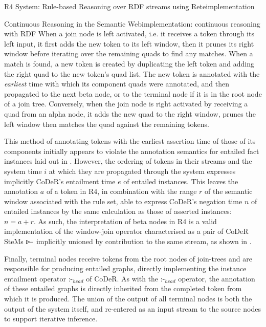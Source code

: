 \begin{nestedsection}{R4 System: Rule-based Reasoning over RDF streams using Rete}{implementation}
\begin{nestedsection}{Continuous Reasoning in the Semantic Web}{implementation: continuous reasoning with RDF}
		When a join node is left activated, i.e. it receives a token through its left input, it first adds the new token to its left window, then it prunes its right window before iterating over the remaining quads to find any matches.
		When a match is found, a new token is created by duplicating the left token and adding the right quad to the new token's quad list.
		The new token is annotated with the \emph{earliest} time with which its component quads were annotated, and then propagated to the next beta node, or to the terminal node if it is in the root node of a join tree.
		Conversely, when the join node is right activated by receiving a quad from an alpha node, it adds the new quad to the right window, prunes the left window then matches the quad against the remaining tokens.

		This method of annotating tokens with the earliest assertion time of those of its components initially appears to violate the annotation semantics for entailed fact instances laid out in .
		However, the ordering of tokens in their streams and the system time $i$ at which they are propagated through the system expresses implicitly CoDeR's entailment time $e$ of entailed instances.
		This leaves the annotation $a$ of a token in R4, in combination with the range $r$ of the semantic window associated with the rule set, able to express CoDeR's negation time ${n}$ of entailed instances by the same calculation as those of asserted instances: ${n = a + r}$.
		As such, the interpretation of beta nodes in R4 is a valid implementation of the window-join operator characterised as a pair of CoDeR SteMs $\rstreamjoin$ implicitly unioned by contribution to the same stream, as shown in .

		Finally, terminal nodes receive tokens from the root nodes of join-trees and are responsible for producing entailed graphs, directly implementing the instance entailment operator $\text{:-}_{head}$ of CoDeR.
		As with the $\text{:-}_{head}$ operator, the annotation of these entailed graphs is directly inherited from the completed token from which it is produced.
 		The union of the output of all terminal nodes is both the output of the system itself, and re-entered as an input stream to the source nodes to support iterative inference.
	\end{nestedsection}
\end{nestedsection}
